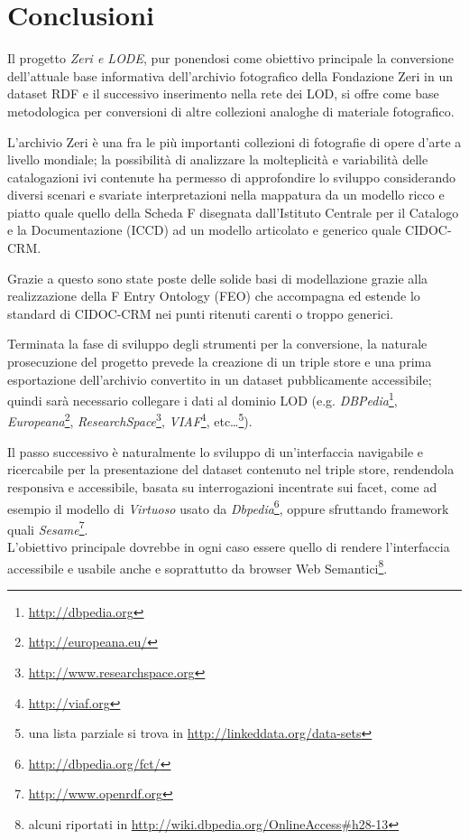 \chapter*{Conclusioni}


Il progetto \emph{Zeri e LODE}, pur ponendosi come obiettivo principale la conversione dell'attuale base informativa dell'archivio fotografico della Fondazione Zeri in un dataset RDF e il successivo inserimento nella rete dei LOD, si offre come base metodologica per conversioni di altre collezioni analoghe di materiale fotografico.

L'archivio Zeri è una fra le più importanti collezioni di fotografie di opere d'arte a livello mondiale; la possibilità di analizzare la molteplicità e variabilità delle catalogazioni ivi contenute ha permesso di approfondire lo sviluppo considerando diversi scenari e svariate interpretazioni nella mappatura da un modello ricco e piatto quale quello della Scheda F disegnata dall'Istituto Centrale per il Catalogo e la Documentazione (ICCD) ad un modello articolato e generico quale CIDOC-CRM.

Grazie a questo sono state poste delle solide basi di modellazione grazie alla realizzazione della F Entry Ontology (FEO) che accompagna ed estende lo standard di CIDOC-CRM nei punti ritenuti carenti o troppo generici.

Terminata la fase di sviluppo degli strumenti per la conversione, la naturale prosecuzione del progetto prevede la creazione di un triple store e una prima esportazione dell'archivio convertito in un dataset pubblicamente accessibile; quindi sarà necessario collegare i dati al dominio LOD (e.g. \emph{DBPedia}\footnote{\url{http://dbpedia.org}}, \emph{Europeana}\footnote{\url{http://europeana.eu/}}, \emph{ResearchSpace}\footnote{\url{http://www.researchspace.org}}, \emph{VIAF}\footnote{\url{http://viaf.org}}, etc\ldots\footnote{una lista parziale si trova in \url{http://linkeddata.org/data-sets}}).

Il passo successivo è naturalmente lo sviluppo di un'interfaccia navigabile e ricercabile per la presentazione del dataset contenuto nel triple store, rendendola responsiva e accessibile, basata su interrogazioni incentrate sui facet, come ad esempio il modello di \emph{Virtuoso} usato da \emph{Dbpedia}\footnote{\url{http://dbpedia.org/fct/}}, oppure sfruttando framework quali \emph{Sesame}\footnote{\url{http://www.openrdf.org}}.\\
L'obiettivo principale dovrebbe in ogni caso essere quello di rendere l'interfaccia accessibile e usabile anche e soprattutto da browser Web Semantici\footnote{alcuni riportati in \url{http://wiki.dbpedia.org/OnlineAccess\#h28-13}}.

